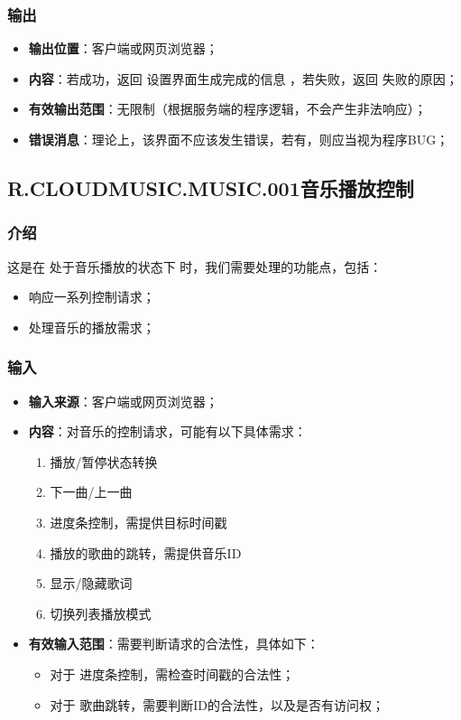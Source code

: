 \subsubsection{输出}
\begin{itemize}
	\item \textbf{输出位置}：客户端或网页浏览器；
	\item \textbf{内容}：若成功，返回 设置界面生成完成的信息 ，若失败，返回 失败的原因；
	\item \textbf{有效输出范围}：无限制（根据服务端的程序逻辑，不会产生非法响应）；
	\item \textbf{错误消息}：理论上，该界面不应该发生错误，若有，则应当视为程序BUG；
\end{itemize}

\subsection{R.CLOUDMUSIC.MUSIC.001音乐播放控制}
\subsubsection{介绍}
	这是在 处于音乐播放的状态下 时，我们需要处理的功能点，包括：
	\begin{itemize}
		\item 响应一系列控制请求；
		\item 处理音乐的播放需求；
	\end{itemize}
\subsubsection{输入}
	\begin{itemize}
		\item \textbf{输入来源}：客户端或网页浏览器；
		\item \textbf{内容}：对音乐的控制请求，可能有以下具体需求：
		\begin{enumerate}
			\item 播放/暂停状态转换
			\item 下一曲/上一曲
			\item 进度条控制，需提供目标时间戳
			\item 播放的歌曲的跳转，需提供音乐ID
			\item 显示/隐藏歌词
			\item 切换列表播放模式
		\end{enumerate}
		\item \textbf{有效输入范围}：需要判断请求的合法性，具体如下：
		\begin{itemize}
			\item 对于 进度条控制，需检查时间戳的合法性；
			\item 对于 歌曲跳转，需要判断ID的合法性，以及是否有访问权； 
		\end{itemize}
	\end{itemize}
